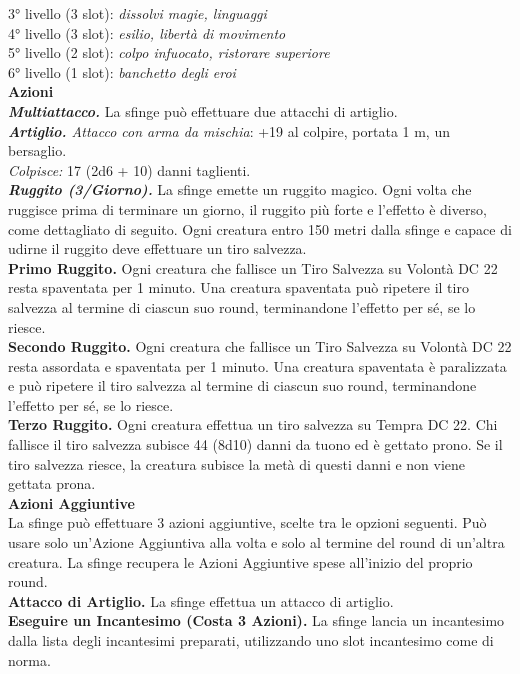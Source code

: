 \begin{multicols}{2}
3° livello (3 slot): \emph{dissolvi magie, linguaggi}\\
4° livello (3 slot): \emph{esilio, libertà di movimento}\\
5° livello (2 slot): \emph{colpo infuocato, ristorare superiore}\\
6° livello (1 slot): \emph{banchetto degli eroi}\\
\smallskip\textbf{Azioni}\\
\emph{\textbf{Multiattacco.}} La sfinge può effettuare due attacchi di artiglio.\\
\emph{\textbf{Artiglio.} Attacco con arma da mischia}: +19 al colpire, portata 1 m, un bersaglio.\\
\emph{Colpisce:} 17 (2d6 + 10) danni taglienti.\\
\emph{\textbf{Ruggito (3/Giorno).}} La sfinge emette un ruggito magico. Ogni volta che ruggisce prima di terminare un giorno, il ruggito più forte e l'effetto è diverso, come dettagliato di seguito. Ogni creatura entro 150 metri dalla sfinge e capace di udirne il ruggito deve effettuare un tiro salvezza.\\
\textbf{Primo Ruggito.} Ogni creatura che fallisce un Tiro Salvezza su Volontà DC  22 resta spaventata per 1 minuto. Una creatura spaventata può ripetere il tiro salvezza al termine di ciascun suo round, terminandone l'effetto per sé, se lo riesce.\\
\textbf{Secondo Ruggito.} Ogni creatura che fallisce un Tiro Salvezza su Volontà DC  22 resta assordata e spaventata per 1 minuto. Una creatura spaventata è paralizzata e può ripetere il tiro salvezza al termine di ciascun suo round, terminandone l'effetto per sé, se lo riesce.\\
\textbf{Terzo Ruggito.} Ogni creatura effettua un tiro salvezza su Tempra DC  22. Chi fallisce il tiro salvezza subisce 44 (8d10) danni da tuono ed è gettato prono. Se il tiro salvezza riesce, la
creatura subisce la metà di questi danni e non viene gettata prona.\\
\textbf{Azioni Aggiuntive}\\
La sfinge può effettuare 3 azioni aggiuntive, scelte tra le opzioni seguenti. Può usare solo un'Azione Aggiuntiva alla volta e solo al termine del round di un'altra creatura. La sfinge recupera le Azioni Aggiuntive spese all'inizio del proprio round.\\
\textbf{Attacco di Artiglio.} La sfinge effettua un attacco di artiglio. \\
\textbf{Eseguire un Incantesimo (Costa 3 Azioni).} La sfinge lancia un incantesimo dalla lista degli incantesimi preparati, utilizzando uno slot incantesimo come di norma.\\

\end{multicols}
